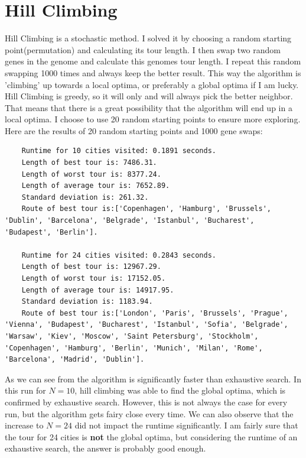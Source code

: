 \documentclass[a4paper, norsk, 12pt]{article}
\begin{document}
\section{Hill Climbing}
Hill Climbing is a stochastic method. I solved it by choosing a random starting point(permutation) and calculating its tour length. I then swap two random genes in the genome and calculate this genomes tour length. I repeat this random swapping 1000 times and always keep the better result. This way the algorithm is 'climbing' up towards a local optima, or preferably a global optima if I am lucky. Hill Climbing is greedy, so it will only and will always pick the better neighbor. That means that there is a great possibility that the algorithm will end up in a local optima. I choose to use 20 random starting points to ensure more exploring.
\newline\newline
Here are the results of 20 random starting points and 1000 gene swaps: 
	\begin{lstlisting}
	Runtime for 10 cities visited: 0.1891 seconds.
	Length of best tour is: 7486.31.
 	Length of worst tour is: 8377.24.
 	Length of average tour is: 7652.89.
 	Standard deviation is: 261.32. 
 	Route of best tour is:['Copenhagen', 'Hamburg', 'Brussels', 'Dublin', 'Barcelona', 'Belgrade', 'Istanbul', 'Bucharest', 'Budapest', 'Berlin'].

	Runtime for 24 cities visited: 0.2843 seconds. 
	Length of best tour is: 12967.29.
 	Length of worst tour is: 17152.05.
 	Length of average tour is: 14917.95.
 	Standard deviation is: 1183.94. 
 	Route of best tour is:['London', 'Paris', 'Brussels', 'Prague', 'Vienna', 'Budapest', 'Bucharest', 'Istanbul', 'Sofia', 'Belgrade', 'Warsaw', 'Kiev', 'Moscow', 'Saint Petersburg', 'Stockholm', 'Copenhagen', 'Hamburg', 'Berlin', 'Munich', 'Milan', 'Rome', 'Barcelona', 'Madrid', 'Dublin'].
	\end{lstlisting}
	As we can see from the algorithm is significantly faster than exhaustive search. In this run for $N = 10$, hill climbing was able to find the global optima, which is confirmed by exhaustive search. However, this is not always the case for every run, but the algorithm gets fairy close every time. We can also observe that the increase to $N = 24$ did not impact the runtime significantly. I am fairly sure that the tour for 24 cities is \textbf{not} the global optima, but considering the runtime of an exhaustive search, the answer is probably good enough.   
\end{document}
